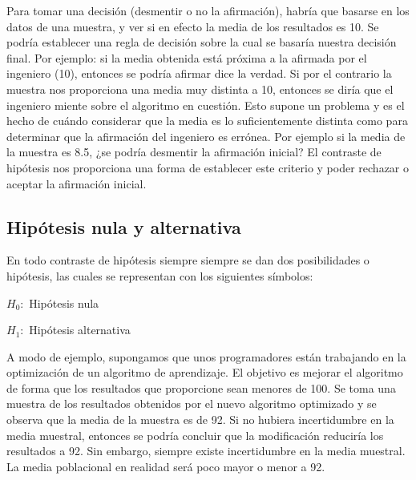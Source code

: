 Para tomar una decisión (desmentir o no la afirmación), habría que basarse en los datos de una muestra, y
ver si en efecto la media de los resultados es 10. Se podría establecer una regla de decisión sobre la cual
se basaría nuestra decisión final. Por ejemplo: si la media obtenida está próxima a la afirmada por el
ingeniero (10), entonces se podría afirmar dice la verdad. Si por el contrario la muestra nos proporciona
una media muy distinta a 10, entonces se diría que el ingeniero miente sobre el algoritmo en cuestión. Esto
supone un problema y es el hecho de cuándo considerar que la media es lo suficientemente distinta como para
determinar que la afirmación del ingeniero es errónea. Por ejemplo si la media de la muestra es 8.5, ¿se
podría desmentir la afirmación inicial? El contraste de hipótesis nos proporciona una forma de establecer
este criterio y poder rechazar o aceptar la afirmación inicial.


\subsection{Hipótesis nula y alternativa}
En todo contraste de hipótesis siempre siempre se dan dos posibilidades o hipótesis, las cuales se representan
con los siguientes símbolos:
\begin{center}
$H_0:$ Hipótesis nula

$H_1:$ Hipótesis alternativa
\end{center}
A modo de ejemplo, supongamos que unos programadores están trabajando en la optimización de un algoritmo
de aprendizaje. El objetivo es mejorar el algoritmo de forma que los resultados que proporcione sean menores
de 100. Se toma una muestra de los resultados obtenidos por el nuevo algoritmo optimizado y se observa que la
media de la muestra es de 92. Si no hubiera incertidumbre en la media muestral, entonces se podría concluir
que la modificación reduciría los resultados a 92. Sin embargo, siempre existe incertidumbre en la media
muestral. La media poblacional en realidad será poco mayor o menor a 92.

